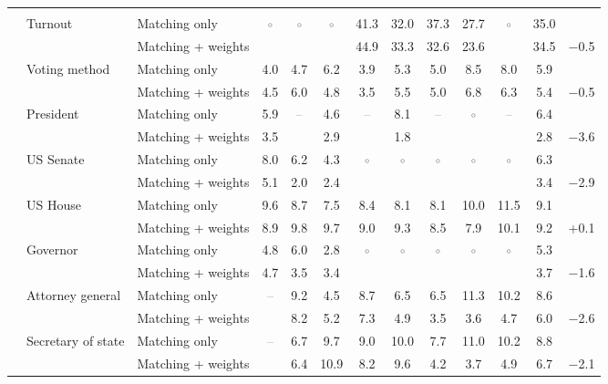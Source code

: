 \begin{table}[!htbp]
{\begin{threeparttable}
\begin{tabular}{llcccccccccc}
\addlinespace[0.3em]
\multicolumn{12}{l}{Non-demographic} \\
\addlinespace[0.1em]
~~Turnout & Matching only & \textcolor{gray}{$\circ$} & \textcolor{gray}{$\circ$} & \textcolor{gray}{$\circ$} & 41.3 & 32.0 & 37.3 & 27.7 & \textcolor{gray}{$\circ$} & 35.0 & \\
 & Matching + weights &  &  &  & 44.9 & 33.3 & 32.6 & 23.6 &  & 34.5 & $-$0.5 \\
\addlinespace[0.1em]
~~Voting method & Matching only & 4.0 & 4.7 & 6.2 & 3.9 & 5.3 & 5.0 & 8.5 & 8.0 & 5.9 & \\
 & Matching + weights & 4.5 & 6.0 & 4.8 & 3.5 & 5.5 & 5.0 & 6.8 & 6.3 & 5.4 & $-$0.5 \\
\addlinespace[0.1em]
~~President & Matching only & 5.9 & \textcolor{gray}{--} & 4.6 & \textcolor{gray}{--} & 8.1 & \textcolor{gray}{--} & \textcolor{gray}{$\circ$} & \textcolor{gray}{--} & 6.4 & \\
 & Matching + weights & 3.5 &  & 2.9 &  & 1.8 &  &  &  & 2.8 & $-$3.6 \\
\addlinespace[0.1em]
~~US Senate & Matching only & 8.0 & 6.2 & 4.3 & \textcolor{gray}{$\circ$} & \textcolor{gray}{$\circ$} & \textcolor{gray}{$\circ$} & \textcolor{gray}{$\circ$} & \textcolor{gray}{$\circ$} & 6.3 & \\
 & Matching + weights & 5.1 & 2.0 & 2.4 &  &  &  &  &  & 3.4 & $-$2.9 \\
\addlinespace[0.1em]
~~US House & Matching only & 9.6 & 8.7 & 7.5 & 8.4 & 8.1 & 8.1 & 10.0 & 11.5 & 9.1 & \\
 & Matching + weights & 8.9 & 9.8 & 9.7 & 9.0 & 9.3 & 8.5 & 7.9 & 10.1 & 9.2 & +0.1 \\
\addlinespace[0.1em]
~~Governor & Matching only & 4.8 & 6.0 & 2.8 & \textcolor{gray}{$\circ$} & \textcolor{gray}{$\circ$} & \textcolor{gray}{$\circ$} & \textcolor{gray}{$\circ$} & \textcolor{gray}{$\circ$} & 5.3 & \\
 & Matching + weights & 4.7 & 3.5 & 3.4 &  &  &  &  &  & 3.7 & $-$1.6 \\
\addlinespace[0.1em]
~~Attorney general & Matching only & \textcolor{gray}{--} & 9.2 & 4.5 & 8.7 & 6.5 & 6.5 & 11.3 & 10.2 & 8.6 & \\
 & Matching + weights &  & 8.2 & 5.2 & 7.3 & 4.9 & 3.5 & 3.6 & 4.7 & 6.0 & $-$2.6 \\
\addlinespace[0.1em]
~~Secretary of state & Matching only & \textcolor{gray}{--} & 6.7 & 9.7 & 9.0 & 10.0 & 7.7 & 11.0 & 10.2 & 8.8 & \\
 & Matching + weights &  & 6.4 & 10.9 & 8.2 & 9.6 & 4.2 & 3.7 & 4.9 & 6.7 & $-$2.1 \\

\end{tabular}
\end{threeparttable}}
\end{table}
